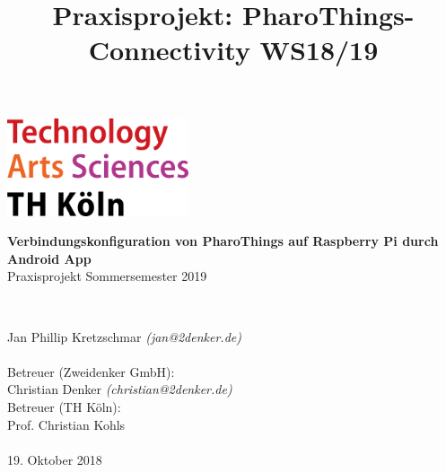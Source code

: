 \documentclass[12pt,a4paper]{article}
\title{Praxisprojekt: PharoThings-Connectivity WS18/19}
\begin{document}
	\begin{titlepage}
    \includegraphics[width=0.4\textwidth]{th_logo.png}
    ~\\[2.5cm]
    \begin{center}
    \textbf{\huge Verbindungskonfiguration von PharoThings auf Raspberry Pi durch Android App}\\[0.5cm]
    {\Large Praxisprojekt Sommersemester 2019}
    \vfill
    \end{center}
    ~\\[2.0cm]
    \begin{flushright}
    {\large Jan Phillip Kretzschmar \it{(jan@2denker.de)}}\\[0.1cm]
    ~\\[1.0cm]
    {\large Betreuer (Zweidenker GmbH):}\\[0.1cm]
    {\large Christian Denker \it{(christian@2denker.de)}}
    ~\\[0.5cm]
    {\large Betreuer (TH Köln):}\\[0.1cm]
    {\large Prof. Christian Kohls}\\[0.1cm]

	~\\[1.0cm]
    {\large 19. Oktober 2018}
	\end{flushright}
    \end{titlepage}
    
    \pagebreak
    
    \pagebreak
    
\end{document}
